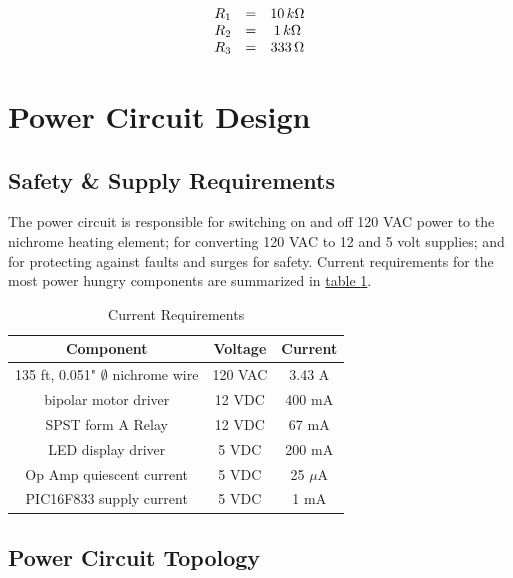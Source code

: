 \documentclass[10pt, twocolumn]{article}
\begin{document}
\begin{equation}
\begin{array}{c c c}
R_{1}	&=&	10\,k\Omega	\\
R_{2}	&=&	1\,k\Omega	\\
R_{3}	&=&	333\,\Omega	\\
\end{array}
\end{equation}

\section{Power Circuit Design}

\subsection{Safety \& Supply Requirements}

The power circuit is responsible for switching on and off 120 VAC power
to the nichrome heating element; for converting 120 VAC to 12 and 5 volt
supplies; and for protecting against faults and surges for safety.
Current requirements for the most power hungry components are summarized in
\hyperref[current-requirements-table]{table \ref{current-requirements-table}}.

\begin{table}
	\centering
	\small
	\caption{Current Requirements}
	\begin{tabular}{c c c}
		\hline\hline
		Component					&Voltage	&Current	\\
		\hline
		135 ft, 0.051" $\emptyset$ nichrome wire	&120 VAC	&3.43 A	\\
		bipolar motor driver		&12 VDC		&400 mA	\\
		SPST form A Relay				&12 VDC		&67 mA	\\
		LED display driver				&5 VDC		&200 mA	\\
		Op Amp quiescent current			&5 VDC		&25 $\mu$A	\\
		PIC16F833 supply current			&5 VDC		&1 mA	\\
		\hline\hline
	\end{tabular}
	\label{current-requirements-table}
\end{table}

\subsection{Power Circuit Topology}
\end{document}
